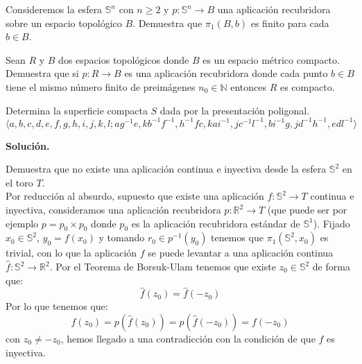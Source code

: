 \documentclass[12pt]{article}
\begin{document}
    \begin{ejercicio}
        Consideremos la esfera $\mathbb{S}^n$ con $n\geq 2$ y $p:\mathbb{S}^n\to B$ una aplicación recubridora sobre un espacio topológico $B$. Demuestra que $\pi_1(B,b)$ es finito para cada $b\in B$.
    \end{ejercicio}

    \begin{ejercicio}
        Sean $R$ y $B$ dos espacios topológicos donde $B$ es un espacio métrico compacto. Demuestra que si $p:R\to B$ es una aplicación recubridora donde cada punto $b\in B$ tiene el mismo número finito de preimágenes $n_0\in \mathbb{N}$ entonces $R$ es compacto.
    \end{ejercicio}

    \begin{ejercicio}
        Determina la superficie compacta $S$ dada por la presentación poligonal.
        \begin{equation*}
            \langle a,b,c,d,e,f,g,h,i,j,k,l;ag^{-1}e,kb^{-1}f^{-1},h^{-1}fc,kai^{-1},jc^{-1}l^{-1},bi^{-1}g,jd^{-1}h^{-1}, edl^{-1} \rangle 
        \end{equation*}
    \end{ejercicio}

    \newpage
    \setcounter{ejercicio}{0}
    \noindent
    \textbf{Solución.}

    \begin{ejercicio}
        Demuestra que no existe una aplicación continua e inyectiva desde la esfera $\mathbb{S}^2$ en el toro $T$.\\

        \noindent
        Por reducción al absurdo, supuesto que existe una aplicación $f:\mathbb{S}^2\to T$ continua e inyectiva, consideramos una aplicación recubridora $p:\mathbb{R}^2\to T$ (que puede ser por ejemplo $p = p_0\times p_0$ donde $p_0$ es la aplicación recubridora estándar de $\mathbb{S}^1$). Fijado $x_0\in \mathbb{S}^2$, $y_0 = f(x_0)$ y tomando $r_0 \in p^{-1}(y_0)$ tenemos que $\pi_1(\mathbb{S}^2,x_0)$ es trivial, con lo que la aplicación $f$ se puede levantar a una aplicación continua $\hat{f}:\mathbb{S}^2\to \mathbb{R}^2$. Por el Teorema de Borsuk-Ulam tenemos que existe $z_0\in \mathbb{S}^2$ de forma que:
        \begin{equation*}
            \hat{f}(z_0) = \hat{f}(-z_0)
        \end{equation*}
        Por lo que tenemos que:
        \begin{equation*}
            f(z_0) = p(\hat{f}(z_0)) = p(\hat{f}(-z_0)) = f(-z_0)
        \end{equation*}
        con $z_0\neq -z_0$, hemos llegado a una contradicción con la condición de que $f$ es inyectiva.
    \end{ejercicio}
\end{document}
